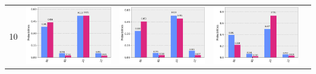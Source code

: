 \documentclass[11pt]{article}
\begin{document}
\begin{table}[h!]
\begin{tabular}{| c | c | c | c | c | }
\begin{minipage}{.215\textwidth}
      \end{minipage}
      \\ \hline
      10 & 
      \begin{minipage}{.215\textwidth}
        \includegraphics[width=\linewidth]{img/one_qecc3_X10.png}
      \end{minipage}&
      \begin{minipage}{.215\textwidth}
        \includegraphics[width=\linewidth]{img/one_qecc3_Y10.png}
      \end{minipage}
      &\begin{minipage}{.215\textwidth}
        \includegraphics[width=\linewidth]{img/one_qecc3_Z10.png}

\end{minipage}
\end{tabular}
\end{table}
\end{document}
